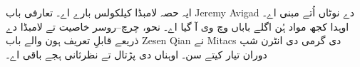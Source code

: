 \documentclass[../../include/open-logic-part]{subfiles}
\begin{document}

\begin{editorial}
ایہ حصہ لامبڈا کیلکولس بارے اے۔ تعارفی باب Jeremy Avigad دے
نوٹاں اُتے مبنی اے۔ اوہدا کجھ مواد ہُن اگلے باباں وچ وی آ گیا اے۔
نحو، چرچ--روسر خاصیت تے لامبڈا دے ذریعے قابلِ تعریف ہون والے باب
Zesen Qian نے Mitacs دی گرمی دی انٹرن شپ دوران تیار کیتے سن۔
اوہناں دی پڑتال تے نظرثانی ہجے باقی اے۔
\end{editorial}





\OLEndPartHook
\end{document}
